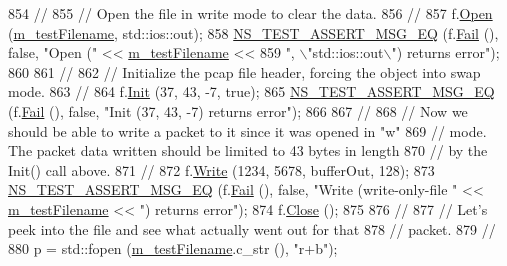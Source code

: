 \begin{DoxyCode}
854   \textcolor{comment}{//}
855   \textcolor{comment}{// Open the file in write mode to clear the data.}
856   \textcolor{comment}{//}
857   f.\hyperlink{classns3_1_1PcapFile_a064e8494e28e823d0bb4e40549f9f483}{Open} (\hyperlink{classRecordHeaderTestCase_a120cda070e5262333c795ce77359528e}{m\_testFilename}, std::ios::out);
858   \hyperlink{group__testing_ga2a9d78cffb3db8e867c35fff0b698cf5}{NS\_TEST\_ASSERT\_MSG\_EQ} (f.\hyperlink{classns3_1_1PcapFile_a2e00aa080890a0c9c3e9f5bd2d6c21d5}{Fail} (), \textcolor{keyword}{false}, \textcolor{stringliteral}{"Open ("} << 
      \hyperlink{classRecordHeaderTestCase_a120cda070e5262333c795ce77359528e}{m\_testFilename} << 
859                          \textcolor{stringliteral}{", \(\backslash\)"std::ios::out\(\backslash\)") returns error"});
860 
861   \textcolor{comment}{//}
862   \textcolor{comment}{// Initialize the pcap file header, forcing the object into swap mode.}
863   \textcolor{comment}{//}
864   f.\hyperlink{classns3_1_1PcapFile_a80c8adea1baa66e3f730df2927b0fc9b}{Init} (37, 43, -7, \textcolor{keyword}{true});
865   \hyperlink{group__testing_ga2a9d78cffb3db8e867c35fff0b698cf5}{NS\_TEST\_ASSERT\_MSG\_EQ} (f.\hyperlink{classns3_1_1PcapFile_a2e00aa080890a0c9c3e9f5bd2d6c21d5}{Fail} (), \textcolor{keyword}{false}, \textcolor{stringliteral}{"Init (37, 43, -7) returns error"});
866 
867   \textcolor{comment}{//}
868   \textcolor{comment}{// Now we should be able to write a packet to it since it was opened in "w" }
869   \textcolor{comment}{// mode.  The packet data written should be limited to 43 bytes in length }
870   \textcolor{comment}{// by the Init() call above.}
871   \textcolor{comment}{//}
872   f.\hyperlink{classns3_1_1PcapFile_a3920f5bae95ca0021875e6e9c2630ccf}{Write} (1234, 5678, bufferOut, 128);
873   \hyperlink{group__testing_ga2a9d78cffb3db8e867c35fff0b698cf5}{NS\_TEST\_ASSERT\_MSG\_EQ} (f.\hyperlink{classns3_1_1PcapFile_a2e00aa080890a0c9c3e9f5bd2d6c21d5}{Fail} (), \textcolor{keyword}{false}, \textcolor{stringliteral}{"Write (write-only-file "} << 
      \hyperlink{classRecordHeaderTestCase_a120cda070e5262333c795ce77359528e}{m\_testFilename} << \textcolor{stringliteral}{") returns error"});
874   f.\hyperlink{classns3_1_1PcapFile_ad3b6c28d464742ee1fa3a64628339a5b}{Close} ();
875 
876   \textcolor{comment}{//}
877   \textcolor{comment}{// Let's peek into the file and see what actually went out for that}
878   \textcolor{comment}{// packet.}
879   \textcolor{comment}{//}
880   p = std::fopen (\hyperlink{classRecordHeaderTestCase_a120cda070e5262333c795ce77359528e}{m\_testFilename}.c\_str (), \textcolor{stringliteral}{"r+b"});

\end{DoxyCode}
